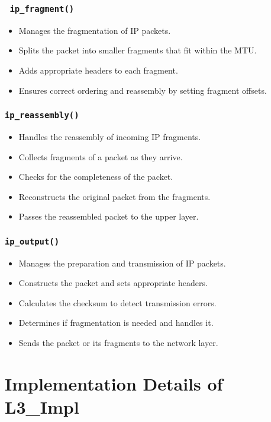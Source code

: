 \subsubsection{\texttt{\Large\ \textbf{ip\_fragment()}}}
\begin{itemize}
    \item Manages the fragmentation of IP packets.
    \item Splits the packet into smaller fragments that fit within the MTU.
    \item Adds appropriate headers to each fragment.
    \item Ensures correct ordering and reassembly by setting fragment offsets.
\end{itemize}

\subsubsection{\texttt{\Large \textbf{ip\_reassembly()}}}
\begin{itemize}
    \item Handles the reassembly of incoming IP fragments.
    \item Collects fragments of a packet as they arrive.
    \item Checks for the completeness of the packet.
    \item Reconstructs the original packet from the fragments.
    \item Passes the reassembled packet to the upper layer.
\end{itemize}

\subsubsection{\texttt{\large ip\_output()}}
\begin{itemize}
    \item Manages the preparation and transmission of IP packets.
    \item Constructs the packet and sets appropriate headers.
    \item Calculates the checksum to detect transmission errors.
    \item Determines if fragmentation is needed and handles it.
    \item Sends the packet or its fragments to the network layer.
\end{itemize}

\section{Implementation Details of L3\_Impl}

